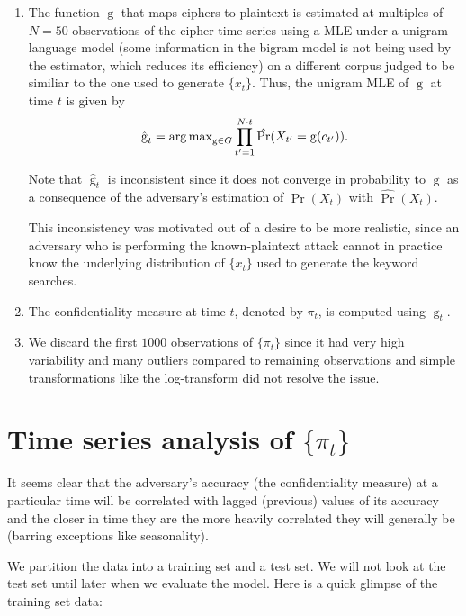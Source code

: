 \documentclass[final,
  11pt,
]{article}
\begin{document}
\begin{enumerate}
\item The function $\operatorname{g}$ that maps ciphers to plaintext is
estimated at multiples of $N=50$ observations of the cipher time series using a
MLE under a unigram language model (some information in the bigram model is not
being used by the estimator, which reduces its efficiency) on a different corpus
judged to be similiar to the one used to generate $\{x_t\}$.
Thus, the unigram MLE of $\operatorname{g}$ at time $t$ is given by
$$
    \hat{\operatorname{g}}_t = \operatorname{arg\,max}_{\operatorname{g} \in G}
    \prod_{t'=1}^{N \cdot t} \hat{\Pr}(X_{t'} = \operatorname{g}(c_{t'})).
$$

Note that $\hat{\operatorname{g}}_t$ is inconsistent since it does not converge
in probability to $\operatorname{g}$ as a consequence of the adversary's
estimation of $\Pr(X_t)$ with $\hat{\Pr}(X_t)$.

This inconsistency was motivated out of a desire to be more realistic, since an
adversary who is performing the known-plaintext attack cannot in practice know
the underlying distribution of $\{x_t\}$ used to generate the keyword searches.
\item The confidentiality measure at time $t$, denoted by $\pi_t$, is computed
using $\hat{\operatorname{g}}_{t}$.

\item We discard the first $1000$ observations of $\{\pi_t\}$ since it had very
high variability and many outliers compared to remaining observations and
simple transformations like the log-transform did not resolve the issue.
\end{enumerate}

\hypertarget{time-series-analysis-of-pi_t}{%
\section{\texorpdfstring{Time series analysis of
\(\{\pi_t\}\)}{Time series analysis of \textbackslash\{\textbackslash pi\_t\textbackslash\}}}\label{time-series-analysis-of-pi_t}}

It seems clear that the adversary's accuracy (the confidentiality measure) at
a particular time will be correlated with lagged (previous) values of its
accuracy and the closer in time they are the more heavily correlated they
will generally be (barring exceptions like seasonality).

We partition the data into a training set and a test set. We will not
look at the test set until later when we evaluate the model. Here is a
quick glimpse of the training set data:
\end{document}
